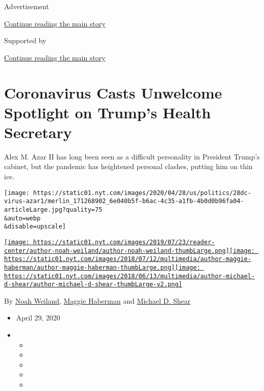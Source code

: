 Advertisement

\protect\hyperlink{after-top}{Continue reading the main story}

Supported by

\protect\hyperlink{after-sponsor}{Continue reading the main story}

\hypertarget{coronavirus-casts-unwelcome-spotlight-on-trumps-health-secretary}{%
\section{Coronavirus Casts Unwelcome Spotlight on Trump's Health
Secretary}\label{coronavirus-casts-unwelcome-spotlight-on-trumps-health-secretary}}

Alex M. Azar II has long been seen as a difficult personality in
President Trump's cabinet, but the pandemic has heightened personal
clashes, putting him on thin ice.

\texttt{[image: https://static01.nyt.com/images/2020/04/28/us/politics/28dc-virus-azar1/merlin\_171268902\_6e040b5f-b6ac-4c35-a1fb-4b0d0b96fa04-articleLarge.jpg?quality=75\\\&auto=webp\\\&disable=upscale]}

\href{https://www.nytimes.com/by/noah-weiland}{\texttt{[image: https://static01.nyt.com/images/2019/07/23/reader-center/author-noah-weiland/author-noah-weiland-thumbLarge.png]}}\href{https://www.nytimes.com/by/maggie-haberman}{\texttt{[image: https://static01.nyt.com/images/2018/07/12/multimedia/author-maggie-haberman/author-maggie-haberman-thumbLarge.png]}}\href{https://www.nytimes.com/by/michael-d-shear}{\texttt{[image: https://static01.nyt.com/images/2018/06/13/multimedia/author-michael-d-shear/author-michael-d-shear-thumbLarge-v2.png]}}

By \href{https://www.nytimes.com/by/noah-weiland}{Noah Weiland},
\href{https://www.nytimes.com/by/maggie-haberman}{Maggie Haberman} and
\href{https://www.nytimes.com/by/michael-d-shear}{Michael D. Shear}

\begin{itemize}
\item
  April 29, 2020
\item
  \begin{itemize}
  \item
  \item
  \item
  \item
  \item
  \end{itemize}
\end{itemize}

